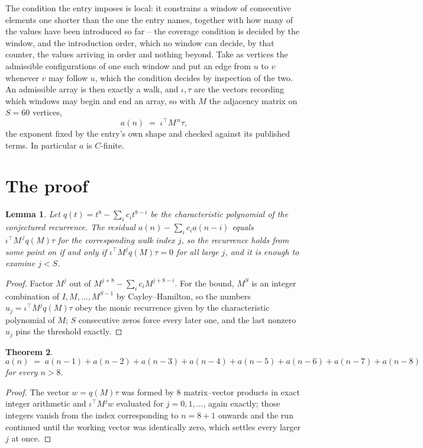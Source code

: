 \documentclass[11pt,a4paper]{article}
\theoremstyle{plain}
\newtheorem{theorem}{Theorem}
\newtheorem{lemma}[theorem]{Lemma}
\theoremstyle{definition}
\begin{document}
The condition the entry imposes is local: it constrains a window of consecutive elements one shorter than the one the entry names, together with how many of the values have been introduced so far -- the coverage condition is decided by the window, and the introduction order, which no window can decide, by that counter, the values arriving in order and nothing beyond. Take as vertices the admissible configurations of one such window and put an edge from $u$ to $v$ whenever $v$ may follow $u$, which the condition decides by inspection of the two.
An admissible array is then exactly a walk, and $\iota,\tau$ are the vectors recording which windows may begin and end an array, so with $M$ the adjacency matrix on $S=60$ vertices,
\[
a(n)\;=\;\iota^{\!\top}M^{\,n}\tau ,
\]
the exponent fixed by the entry's own shape and checked against its published terms. In
particular $a$ is $C$-finite.

\section{The proof}

\begin{lemma}\label{lem:crit}
Let $q(t)=t^{8}-\sum_i c_it^{8-i}$ be the characteristic polynomial of the
conjectured recurrence. The residual $a(n)-\sum_ic_ia(n-i)$ equals
$\iota^{\!\top}M^{\,j}q(M)\tau$ for the corresponding walk index $j$, so the recurrence
holds from some point on if and only if $\iota^{\!\top}M^{j}q(M)\tau=0$ for all large $j$,
and it is enough to examine $j<S$.
\end{lemma}

\begin{proof}
Factor $M^{j}$ out of $M^{j+8}-\sum_ic_iM^{j+8-i}$. For the bound, $M^{S}$
is an integer combination of $I,M,\dots,M^{S-1}$ by Cayley--Hamilton, so the numbers
$u_j=\iota^{\!\top}M^{j}q(M)\tau$ obey the monic recurrence given by the characteristic
polynomial of $M$; $S$ consecutive zeros force every later one, and the last nonzero $u_j$
pins the threshold exactly.
\end{proof}

\begin{theorem}
\[
a(n)\;=\;a(n-1) + a(n-2) + a(n-3) + a(n-4) + a(n-5) + a(n-6) + a(n-7) + a(n-8)
\]
for every $n>8$.
\end{theorem}

\begin{proof}
The vector $w=q(M)\tau$ was formed by $8$ matrix--vector products in exact integer
arithmetic and $\iota^{\!\top}M^{j}w$ evaluated for $j=0,1,\dots$, again exactly; those
integers vanish from the index corresponding to $n=8+1$ onwards and the run continued
until the working vector was identically zero, which settles every larger $j$ at once.
\end{proof}
\end{document}
